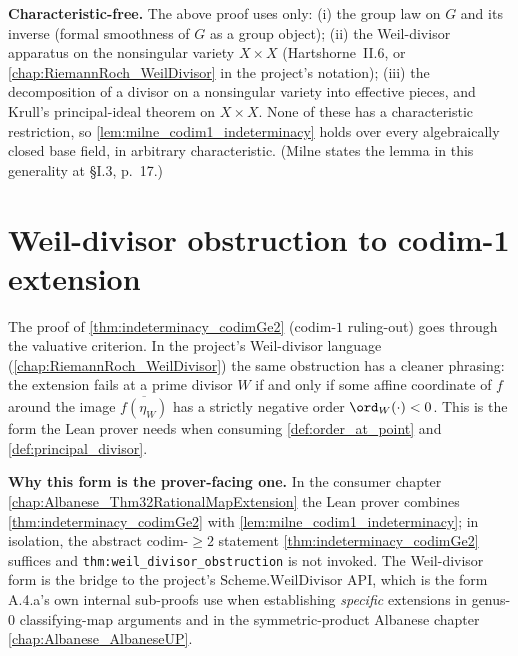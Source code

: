 \begin{remark}
  \label{rmk:milne_lem33_charfree}
  \textbf{Characteristic-free.} The above proof uses only: (i) the group law on \(G\)
  and its inverse (formal smoothness of \(G\) as a group object); (ii) the Weil-divisor
  apparatus on the nonsingular variety \(X \times X\) (Hartshorne~II.6, or
  \cref{chap:RiemannRoch_WeilDivisor} in the project's notation); (iii) the
  decomposition of a divisor on a nonsingular variety into effective pieces, and
  Krull's principal-ideal theorem on \(X \times X\). None of these has a characteristic
  restriction, so \cref{lem:milne_codim1_indeterminacy} holds over every
  algebraically closed base field, in arbitrary characteristic. (Milne states the
  lemma in this generality at \S I.3, p.~17.)
\end{remark}

\section{Weil-divisor obstruction to codim-1 extension}
\label{sec:weil_obstruction}

The proof of \cref{thm:indeterminacy_codimGe2} (codim-\(1\) ruling-out) goes
through the valuative criterion. In the project's Weil-divisor language
(\cref{chap:RiemannRoch_WeilDivisor}) the same obstruction has a cleaner phrasing:
the extension fails at a prime divisor \(W\) if and only if some affine coordinate of
\(f\) around the image \(\overline{f(\eta_W)}\) has a strictly negative order
\(\ord_W(\cdot) < 0\). This is the form the Lean prover needs when consuming
\cref{def:order_at_point} and \cref{def:principal_divisor}.


\begin{remark}
  \label{rmk:weil_obstruction_application}
  \textbf{Why this form is the prover-facing one.} In the consumer chapter
  \cref{chap:Albanese_Thm32RationalMapExtension} the Lean prover combines
  \cref{thm:indeterminacy_codimGe2} with \cref{lem:milne_codim1_indeterminacy}; in
  isolation, the abstract codim-\(\geq 2\) statement
  \cref{thm:indeterminacy_codimGe2} suffices and \texttt{thm:weil_divisor_obstruction}
  is not invoked. The Weil-divisor form is the bridge to the project's
  \(\mathrm{Scheme.WeilDivisor}\) API, which is the form A.4.a's own internal sub-proofs
  use when establishing \emph{specific} extensions in genus-\(0\) classifying-map
  arguments and in the symmetric-product Albanese chapter
  \cref{chap:Albanese_AlbaneseUP}.
\end{remark}


